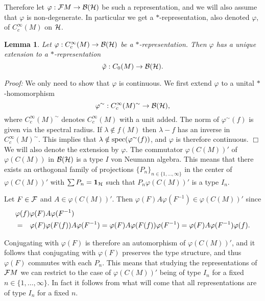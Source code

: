 \documentclass[12pt]{article}
\def\cb{{\cal B}}
\def\cf{{\cal F}}
\def\ch{{\cal H}}
\newtheorem{lemma}[thm]{Lemma}
\newcommand{\cF}{{\cal F}}
\begin{document}
 Therefore let $\varphi : \cF M \to \cb (\ch )$ be such a representation, and we will also assume that $\varphi$ is non-degenerate. In particular we get a $*$-representation, also denoted $\varphi$, of $C_c^\infty (M)$ on $\ch$.
 
\begin{lemma}
Let $\varphi : C^\infty_c (M) \to  \cb (\ch )$ be a $*$-representation. Then $\varphi$ has a unique extension to a $*$-representation 
 $$\tilde{\varphi} :C_0(M)\to   \cb ( \ch).$$
\end{lemma}

\textit{Proof:} We only need to show that $\varphi$ is continuous. We first extend $\varphi$ to a unital $*$-homomorphism 
$$\varphi^\sim :  C^\infty_c (M)^\sim  \to  \cb (\ch ) , $$
where $C^\infty_c (M)^\sim$ denotes $C^\infty_c (M) $ with a unit added. The norm of $\varphi^\sim (f)$ is given via the spectral radius. If $\lambda \notin f(M)$ then $\lambda-f$ has an inverse in  $C^\infty_c (M)^\sim$. This implies that $\lambda \notin \hbox{spec}(\varphi^\sim (f))$, and $\varphi$ is therefore continuous. \hfill $\Box$   
\\

We will also denote the extension by $\varphi$. The commutator $\varphi (C(M))' $ of $\varphi (C(M))$ in $\cb (\ch )$ is a type $I$ von Neumann algebra. This means that there exists an orthogonal family of projections $\{ P_n  \}_{n\in \{ 1, \ldots , \infty \} }$ in the center of $\varphi (C(M))' $ with $\sum P_n=\mathbf{1_\ch}$ such that $P_n \varphi (C(M))' $ is a type $I_n$.     

Let $F\in \cF$ and $A\in \varphi (C(M))' $. Then $\varphi (F)A \varphi (F^{-1}) \in \varphi (C(M))' $ since 
\begin{eqnarray*}
\lefteqn{\varphi (f) \varphi (F)A \varphi (F^{-1})} \\
&  =&   \varphi (F) \varphi (F(f))A \varphi (F^{-1}) =\varphi (F)  A \varphi (F(f)) \varphi (F^{-1})= \varphi (F)A \varphi (F^{-1}) \varphi (f) .  
\end{eqnarray*}

Conjugating with $\varphi (F)$ is therefore an automorphism of $\varphi (C(M))' $, and it follows that conjugating with $\varphi (F)$ preserves the type structure, and thus  $\varphi (F)$ commutes with each $P_n$. This means that studying the representations of $\cf M$ we can restrict to the case of $\varphi (C(M))' $ being of type $I_n$ for a fixed $n\in \{ 1, \ldots , \infty \}$. In fact it follows from what will come that all representations are of type $I_n$ for a fixed $n$. 
\end{document}
